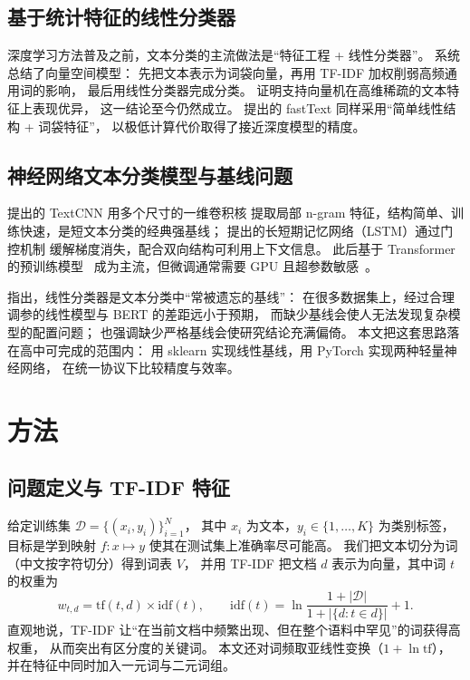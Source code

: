 \documentclass[11pt, a4paper]{ctexart}
\begin{document}
\subsection{基于统计特征的线性分类器}

深度学习方法普及之前，文本分类的主流做法是“特征工程 + 线性分类器”。
\citet{manning2008introduction} 系统总结了向量空间模型：
先把文本表示为词袋向量，再用 TF-IDF 加权削弱高频通用词的影响，
最后用线性分类器完成分类。
\citet{joachims1998text} 证明支持向量机在高维稀疏的文本特征上表现优异，
这一结论至今仍然成立。
\citet{joulin2017bag} 提出的 fastText 同样采用“简单线性结构 + 词袋特征”，
以极低计算代价取得了接近深度模型的精度。

\subsection{神经网络文本分类模型与基线问题}

\citet{kim2014convolutional} 提出的 TextCNN 用多个尺寸的一维卷积核
提取局部 n-gram 特征，结构简单、训练快速，是短文本分类的经典强基线；
\citet{hochreiter1997long} 提出的长短期记忆网络（LSTM）通过门控机制
缓解梯度消失，配合双向结构可利用上下文信息。
此后基于 Transformer 的预训练模型~\citep{vaswani2017attention, devlin2019bert}
成为主流，但微调通常需要 GPU 且超参数敏感~\citep{sun2019how}。

\citet{lin2023linear} 指出，线性分类器是文本分类中“常被遗忘的基线”：
在很多数据集上，经过合理调参的线性模型与 BERT 的差距远小于预期，
而缺少基线会使人无法发现复杂模型的配置问题；
\citet{sculley2018winner} 也强调缺少严格基线会使研究结论充满偏倚。
本文把这套思路落在高中可完成的范围内：
用 sklearn 实现线性基线，用 PyTorch 实现两种轻量神经网络，
在统一协议下比较精度与效率。

\section{方法}

\subsection{问题定义与 TF-IDF 特征}

给定训练集 $\mathcal{D}=\{(x_i, y_i)\}_{i=1}^{N}$，
其中 $x_i$ 为文本，$y_i \in \{1,\dots,K\}$ 为类别标签，
目标是学到映射 $f: x \mapsto y$ 使其在测试集上准确率尽可能高。
我们把文本切分为词（中文按字符切分）得到词表 $V$，
并用 TF-IDF 把文档 $d$ 表示为向量，其中词 $t$ 的权重为
\begin{equation}
  w_{t,d} = \mathrm{tf}(t,d) \times \mathrm{idf}(t),
  \qquad
  \mathrm{idf}(t) = \ln \frac{1 + |\mathcal{D}|}{1 + |\{d : t \in d\}|} + 1 .
\end{equation}
直观地说，TF-IDF 让“在当前文档中频繁出现、但在整个语料中罕见”的词获得高权重，
从而突出有区分度的关键词。
本文还对词频取亚线性变换（$1+\ln \mathrm{tf}$），
并在特征中同时加入一元词与二元词组。
\end{document}
